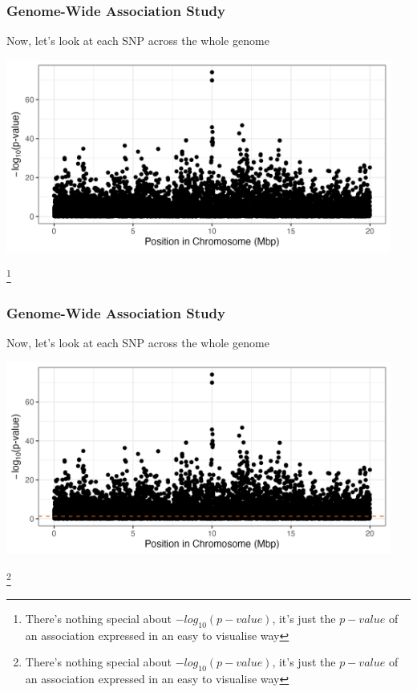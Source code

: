 \documentclass[xcolor=dvipsnames]{beamer}
\newcommand\blfootnote[1]{%
	\begingroup
	\renewcommand\thefootnote{}\footnote{#1}%
	\addtocounter{footnote}{-1}%
	\endgroup
}
\begin{document}
\begin{frame}
	\frametitle{Genome-Wide Association Study}
	Now, let's look at each SNP across the whole genome 
	
	\includegraphics[keepaspectratio, width  = 0.95\textwidth]{img/uncorPlot_Data}				
	
	\blfootnote{There's nothing special about $-log_{10}(p-value)$, it's just the $p-value$ of an association expressed in an easy to visualise way}
\end{frame}


\begin{frame}
	\frametitle{Genome-Wide Association Study}
	Now, let's look at each SNP across the whole genome 
	
	\includegraphics[keepaspectratio, width  = 0.95\textwidth]{img/uncorPlot_DataHline}				
	
	\blfootnote{There's nothing special about $-log_{10}(p-value)$, it's just the $p-value$ of an association expressed in an easy to visualise way}
\end{frame}
\end{document}
